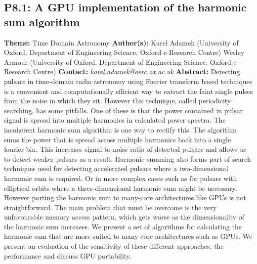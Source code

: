 \documentclass{report}
\begin{document}
\subsection*{P8.1: A GPU implementation of the harmonic sum algorithm}
{\bf Theme:}  Time Domain Astronomy\newline
{\bf Author(s):}\newline
Karel Adamek (University of Oxford, Department of Engineering Science, Oxford e-Research Centre) \newline Wesley Armour (University of Oxford, Department of Engineering Science, Oxford e-Research Centre) \newline   \newline   \newline  \newline  \newline\newline
{\bf Contact:} {\it karel.adamek@oerc.ox.ac.uk}\newline
\newline\newline
{\bf Abstract:}\newline
Detecting pulsars in time-domain radio astronomy using Fourier transform based techniques is a convenient and computationally efficient way to extract the faint single pulses from the noise in which they sit. However this technique, called periodicity searching, has some pitfalls. One of these is that the power contained in pulsar signal is spread into multiple harmonics in calculated power spectra. The incoherent harmonic sum algorithm is one way to rectify this. The algorithm sums the power that is spread across multiple harmonics back into a single fourier bin. This increases signal-to-noise ratio of detected pulsars and allows us to detect weaker pulsars as a result. Harmonic summing also forms part of search techniques used for detecting accelerated pulsars where a two-dimensional harmonic sum is required. Or in more complex cases such as for pulsars with elliptical orbits where a three-dimensional harmonic sum might be necessary. However porting the harmonic sum to many-core architectures like GPUs is not straightforward. The main problem that must be overcome is the very unfavourable memory access pattern, which gets worse as the dimensionality of the harmonic sum increases. We present a set of algorithms for calculating the harmonic sum that are more suited to many-core architectures such as GPUs. We present an evaluation of the sensitivity of these different approaches, the performance and discuss GPU portability.\newline
\end{document}
